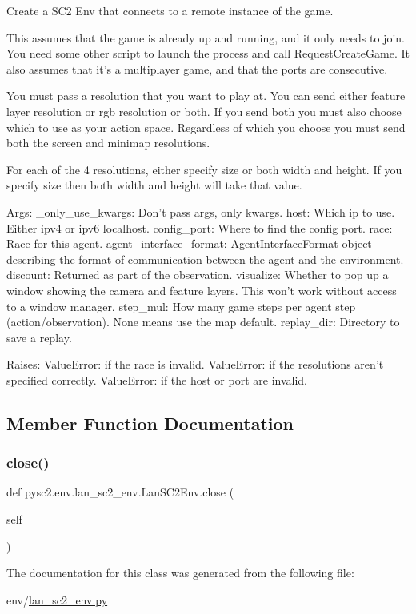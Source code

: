 \begin{DoxyVerb}Create a SC2 Env that connects to a remote instance of the game.

This assumes that the game is already up and running, and it only needs to
join. You need some other script to launch the process and call
RequestCreateGame. It also assumes that it's a multiplayer game, and that
the ports are consecutive.

You must pass a resolution that you want to play at. You can send either
feature layer resolution or rgb resolution or both. If you send both you
must also choose which to use as your action space. Regardless of which you
choose you must send both the screen and minimap resolutions.

For each of the 4 resolutions, either specify size or both width and
height. If you specify size then both width and height will take that value.

Args:
  _only_use_kwargs: Don't pass args, only kwargs.
  host: Which ip to use. Either ipv4 or ipv6 localhost.
  config_port: Where to find the config port.
  race: Race for this agent.
  agent_interface_format: AgentInterfaceFormat object describing the
  format of communication between the agent and the environment.
  discount: Returned as part of the observation.
  visualize: Whether to pop up a window showing the camera and feature
  layers. This won't work without access to a window manager.
  step_mul: How many game steps per agent step (action/observation). None
  means use the map default.
  replay_dir: Directory to save a replay.

Raises:
  ValueError: if the race is invalid.
  ValueError: if the resolutions aren't specified correctly.
  ValueError: if the host or port are invalid.
\end{DoxyVerb}
 

\subsection{Member Function Documentation}
\mbox{\label{classpysc2_1_1env_1_1lan__sc2__env_1_1_lan_s_c2_env_afe3313585911c165f7128cb6c8afa21f}} 
\subsubsection{\texorpdfstring{close()}{close()}}
{\footnotesize\ttfamily def pysc2.\+env.\+lan\+\_\+sc2\+\_\+env.\+Lan\+S\+C2\+Env.\+close (\begin{DoxyParamCaption}\item[{}]{self }\end{DoxyParamCaption})}



The documentation for this class was generated from the following file\+:\begin{DoxyCompactItemize}
\item 
env/\mbox{\hyperlink{lan__sc2__env_8py}{lan\+\_\+sc2\+\_\+env.\+py}}\end{DoxyCompactItemize}

